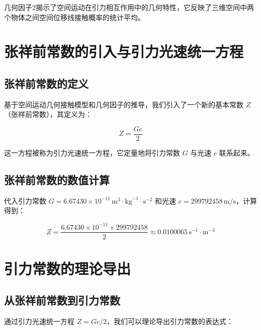 \documentclass[12pt,a4paper]{article}
\begin{document}
几何因子2揭示了空间运动在引力相互作用中的几何特性，它反映了三维空间中两个物体之间空间位移线接触概率的统计平均。

\section{张祥前常数的引入与引力光速统一方程}
\label{section:zhang_constant_introduction}

\subsection{张祥前常数的定义}
\label{subsection:zhang_constant_definition}

基于空间运动几何接触模型和几何因子的推导，我们引入了一个新的基本常数 $Z$（张祥前常数），其定义为：

\begin{equation}
Z = \frac{G c}{2}
\label{eq:zhang_constant_definition}
\end{equation}

这一方程被称为引力光速统一方程，它定量地将引力常数 $G$ 与光速 $c$ 联系起来。

\subsection{张祥前常数的数值计算}
\label{subsection:zhang_constant_numerical}

代入引力常数 $G = 6.67430 \times 10^{-11} \, \text{m}^3 \cdot \text{kg}^{-1} \cdot \text{s}^{-2}$ 和光速 $c = 299792458 \, \text{m/s}$，计算得到：

\begin{equation}
Z = \frac{6.67430 \times 10^{-11} \times 299792458}{2} \approx 0.0100065 \, \text{s}^{-1} \cdot \text{m}^{-3}
\label{eq:zhang_constant_calculation}
\end{equation}

\section{引力常数的理论导出}
\label{section:gravitational_constant_derivation}

\subsection{从张祥前常数到引力常数}
\label{subsection:from_zhang_to_g}

通过引力光速统一方程 $Z = G c / 2$，我们可以理论导出引力常数的表达式：
\end{document}
